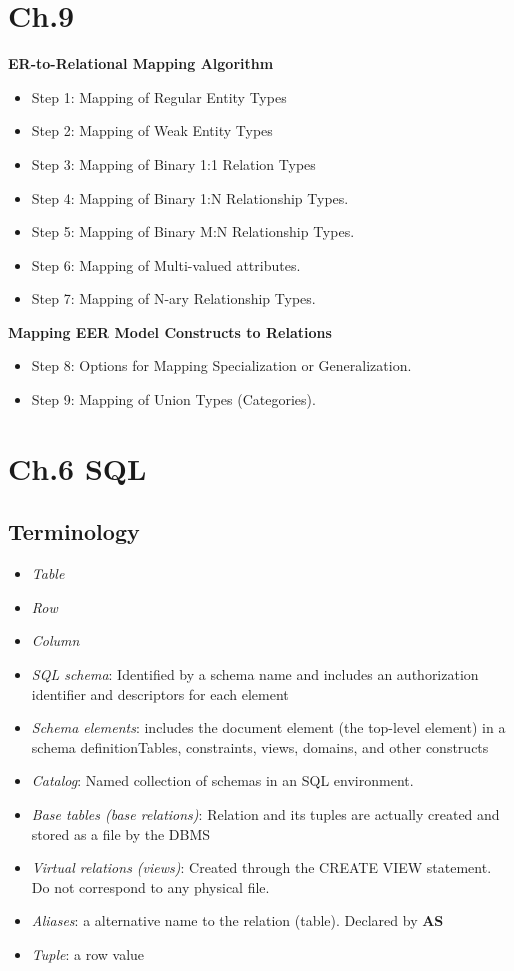 \section{Ch.9}
\textbf{ER-to-Relational Mapping Algorithm}
\begin{itemize}
    \item Step 1: Mapping of Regular Entity Types
    \item Step 2: Mapping of Weak Entity Types
    \item Step 3: Mapping of Binary 1:1 Relation Types
    \item Step 4: Mapping of Binary 1:N Relationship Types.
    \item Step 5: Mapping of Binary M:N Relationship Types.
    \item Step 6: Mapping of Multi-valued attributes.
    \item Step 7: Mapping of N-ary Relationship Types.
\end{itemize}

\noindent\textbf{Mapping EER Model Constructs to Relations}
\begin{itemize}
    \item Step 8: Options for Mapping Specialization or Generalization.
    \item Step 9: Mapping of Union Types (Categories).
\end{itemize}

\newpage
\section{Ch.6 SQL}
\subsection{Terminology}
\begin{itemize}
    \item \textit{Table}
    \item \textit{Row}
    \item \textit{Column}
    \item \textit{SQL schema}: Identified by a schema name and includes an authorization identifier and descriptors
for each element
    \item \textit{Schema elements}: includes the document element (the top-level element) in a schema definitionTables, constraints, views, domains, and other 
constructs
    \item \textit{Catalog}: Named collection of schemas in an SQL environment.
    \item \textit{Base tables (base relations)}: Relation and its tuples are actually created and 
        stored as a file by the DBMS
    \item \textit{Virtual relations (views)}: Created through the CREATE VIEW statement. 
        Do not correspond to any physical file.
    \item \textit{Aliases}: a alternative name to the relation (table). Declared by \textbf{AS}
    \item \textit{Tuple}: a row value
\end{itemize} 

